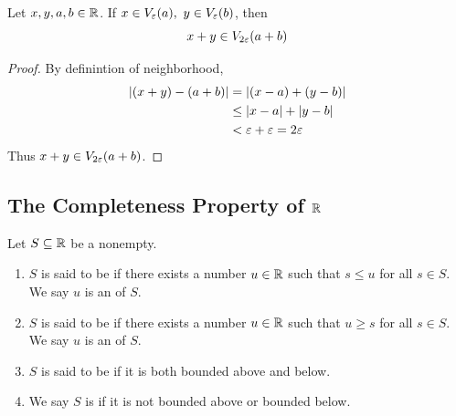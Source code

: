 \documentclass[a4paper,12pt]{article}
\begin{document}
\begin{proposition}
    Let \(x,y,a,b\in\mathbb{R}\). If \(x\in\neighbor{\varepsilon}{a},\ y\in\neighbor{\varepsilon}{b}\), then 
    \[x+y\in V_{2\varepsilon}{(a+b)}\]
    \begin{proof} By definintion of neighborhood,
        \begin{align*}
            \left\lvert (x+y)-(a+b)\right\rvert&=\left\lvert (x-a)+(y-b)\right\rvert\\
            &\le\left\lvert x-a\right\rvert+\left\lvert y-b\right\rvert\\
            &<\varepsilon+\varepsilon=2\varepsilon
        \end{align*}
        Thus \(x+y\in V_{2\varepsilon}{(a+b)}\).
    \end{proof}
\end{proposition}

\newpage

\subsection{The Completeness Property of $\mathbb{R}$}

\begin{definition}
    Let \(S\subseteq\mathbb{R}\) be a nonempty.
    \begin{enumerate}
        \item \(S\) is said to be  if there exists a number \(u\in\mathbb{R}\) such that \(s\le u\) for all \(s\in S\). 
        We say \(u\) is an  of \(S\).
        \item \(S\) is said to be  if there exists a number \(u\in\mathbb{R}\) such that \(u\ge s\) for all \(s\in S\). 
        We say \(u\) is an  of \(S\).
        \item \(S\) is said to be  if it is both bounded above and below.
        \item We say \(S\) is  if it is not bounded above or bounded below.\\
    \end{enumerate}
\end{definition}
\end{document}
